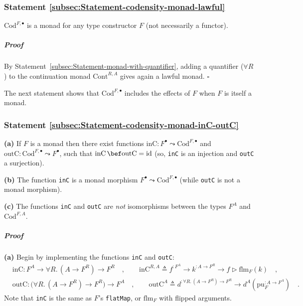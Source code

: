 \subsubsection{Statement \label{subsec:Statement-codensity-monad-lawful}\ref{subsec:Statement-codensity-monad-lawful}}

$\text{Cod}^{F,\bullet}$ is a monad for any type constructor $F$
(not necessarily a functor).

\subparagraph{Proof}

By Statement~\ref{subsec:Statement-monad-with-quantifier}, adding
a quantifier ($\forall R$) to the continuation monad $\text{Cont}^{R,A}$
gives again a lawful monad. $\square$

The next statement shows that $\text{Cod}^{F,\bullet}$ includes the
effects of $F$ when $F$ is itself a monad.

\subsubsection{Statement \label{subsec:Statement-codensity-monad-inC-outC}\ref{subsec:Statement-codensity-monad-inC-outC}}

\textbf{(a)} If $F$ is a monad then there exist functions $\text{inC}:F^{\bullet}\leadsto\text{Cod}^{F,\bullet}$
and $\text{outC}:\text{Cod}^{F,\bullet}\leadsto F^{\bullet}$, such
that $\text{inC}\,\bef\text{outC}=\text{id}$ (so, \lstinline!inC!
is an injection and \lstinline!outC! a surjection). 

\textbf{(b)} The function \lstinline!inC! is a monad morphism $F^{\bullet}\leadsto\text{Cod}^{F,\bullet}$
(while \lstinline!outC! is not a monad morphism).

\textbf{(c)} The functions \lstinline!inC! and \lstinline!outC!
are \emph{not} isomorphisms between the types $F^{A}$ and $\text{Cod}^{F,A}$.

\subparagraph{Proof}

\textbf{(a)} Begin by implementing the functions \lstinline!inC!
and \lstinline!outC!:
\begin{align*}
 & \text{inC}:F^{A}\rightarrow\forall R.\,(A\rightarrow F^{R})\rightarrow F^{R}\quad,\quad\quad\text{inC}^{R,A}\triangleq f^{:F^{A}}\rightarrow k^{:A\rightarrow F^{R}}\rightarrow f\triangleright\text{flm}_{F}(k)\quad,\\
 & \text{outC}:\big(\forall R.\,(A\rightarrow F^{R})\rightarrow F^{R}\big)\rightarrow F^{A}\quad,\quad\quad\text{outC}^{A}\triangleq d^{:\forall R.\,(A\rightarrow F^{R})\rightarrow F^{R}}\rightarrow d^{A}(\text{pu}_{F}^{:A\rightarrow F^{A}})\quad.
\end{align*}
Note that \lstinline!inC! is the same as $F$\textsf{'}s \lstinline!flatMap!,
or $\text{flm}_{F}$ with flipped arguments.

